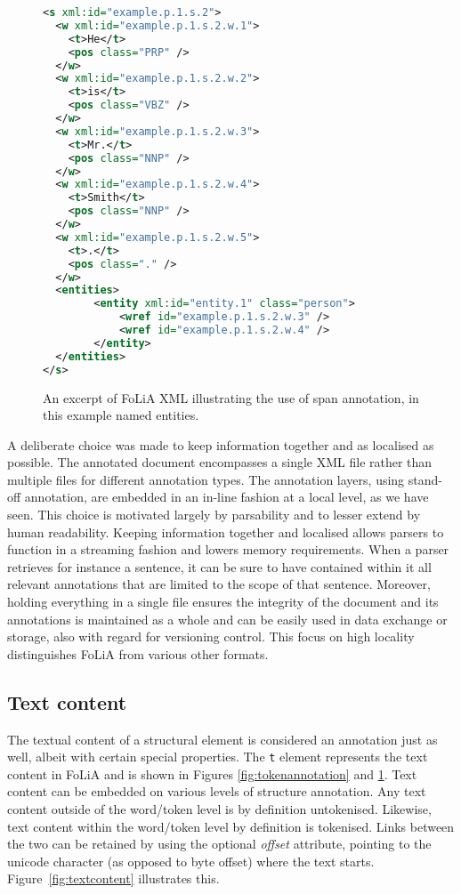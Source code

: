 \documentclass[a4paper,10pt,twoside]{article}
\begin{document}
\begin{figure}[tbh]
\label{fig:spanannotation}
\begin{lstlisting}[language=xml]
<s xml:id="example.p.1.s.2">
  <w xml:id="example.p.1.s.2.w.1">
    <t>He</t>
    <pos class="PRP" />
  </w>
  <w xml:id="example.p.1.s.2.w.2">
    <t>is</t>
    <pos class="VBZ" />
  </w>
  <w xml:id="example.p.1.s.2.w.3">
    <t>Mr.</t>
    <pos class="NNP" />
  </w>
  <w xml:id="example.p.1.s.2.w.4">
    <t>Smith</t>
    <pos class="NNP" />
  </w>
  <w xml:id="example.p.1.s.2.w.5">
    <t>.</t>
    <pos class="." />
  </w>
  <entities>
        <entity xml:id="entity.1" class="person">
            <wref id="example.p.1.s.2.w.3" />
            <wref id="example.p.1.s.2.w.4" />
        </entity>
  </entities>
</s>
\end{lstlisting}
\caption{An excerpt of FoLiA XML illustrating the use of span annotation, in this example named entities.}
\end{figure}

A deliberate choice was made to keep information together and as
localised as possible. The annotated document encompasses a single XML file
rather than multiple files for different annotation types. The annotation
layers,  using stand-off annotation, are embedded in an in-line fashion at a
local level, as we have seen. This choice is motivated largely by parsability
and to lesser extend by human readability. Keeping information together and
localised allows parsers to function in a streaming fashion and lowers memory
requirements. When a parser retrieves for instance a sentence, it can be sure to have
contained within it all relevant annotations that are limited to the scope of
that sentence. Moreover, holding everything in a single file ensures the integrity of the document and its
annotations is maintained as a whole and can be easily used in data exchange or
storage, also with regard for versioning control. This focus on high locality
distinguishes FoLiA from various other formats. 

\subsection{Text content} 

The textual content of a structural element is considered an annotation just as well,
albeit with certain special properties. The \texttt{t} element represents the
text content in FoLiA and is shown in Figures  \ref{fig:tokenannotation} and
\ref{fig:spanannotation}. Text content can be embedded on various levels of
structure annotation. Any text content outside of the word/token level is by
definition untokenised. Likewise, text content within the word/token level by
definition is tokenised. Links between the two can be retained by using the
optional \emph{offset} attribute, pointing to the unicode character (as opposed
to byte offset) where the text starts. Figure~\ref{fig:textcontent} illustrates
this.
\end{document}

